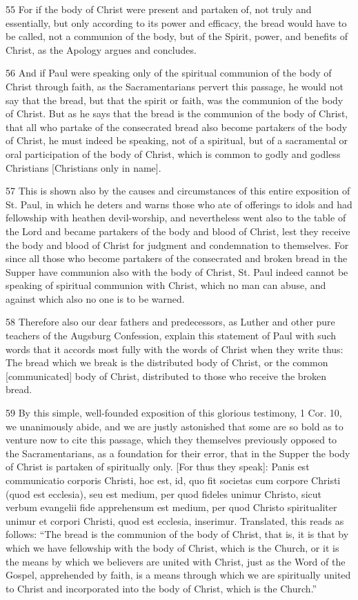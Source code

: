 55 For if the body of Christ were present and partaken of, not truly and essentially, but only according to its power and efficacy, the bread would have to be called, not a communion of the body, but of the Spirit, power, and benefits of Christ, as the Apology argues and concludes.

56 And if Paul were speaking only of the spiritual communion of the body of Christ through faith, as the Sacramentarians pervert this passage, he would not say that the bread, but that the spirit or faith, was the communion of the body of Christ. But as he says that the bread is the communion of the body of Christ, that all who partake of the consecrated bread also become partakers of the body of Christ, he must indeed be speaking, not of a spiritual, but of a sacramental or oral participation of the body of Christ, which is common to godly and godless Christians [Christians only in name].

57 This is shown also by the causes and circumstances of this entire exposition of St. Paul, in which he deters and warns those who ate of offerings to idols and had fellowship with heathen devil-worship, and nevertheless went also to the table of the Lord and became partakers of the body and blood of Christ, lest they receive the body and blood of Christ for judgment and condemnation to themselves. For since all those who become partakers of the consecrated and broken bread in the Supper have communion also with the body of Christ, St. Paul indeed cannot be speaking of spiritual communion with Christ, which no man can abuse, and against which also no one is to be warned.

58 Therefore also our dear fathers and predecessors, as Luther and other pure teachers of the Augsburg Confession, explain this statement of Paul with such words that it accords most fully with the words of Christ when they write thus: The bread which we break is the distributed body of Christ, or the common [communicated] body of Christ, distributed to those who receive the broken bread.

59 By this simple, well-founded exposition of this glorious testimony, 1 Cor. 10, we unanimously abide, and we are justly astonished that some are so bold as to venture now to cite this passage, which they themselves previously opposed to the Sacramentarians, as a foundation for their error, that in the Supper the body of Christ is partaken of spiritually only. [For thus they speak]: Panis est communicatio corporis Christi, hoc est, id, quo fit societas cum corpore Christi (quod est ecclesia), seu est medium, per quod fideles unimur Christo, sicut verbum evangelii fide apprehensum est medium, per quod Christo spiritualiter unimur et corpori Christi, quod est ecclesia, inserimur. Translated, this reads as follows: “The bread is the communion of the body of Christ, that is, it is that by which we have fellowship with the body of Christ, which is the Church, or it is the means by which we believers are united with Christ, just as the Word of the Gospel, apprehended by faith, is a means through which we are spiritually united to Christ and incorporated into the body of Christ, which is the Church.”

